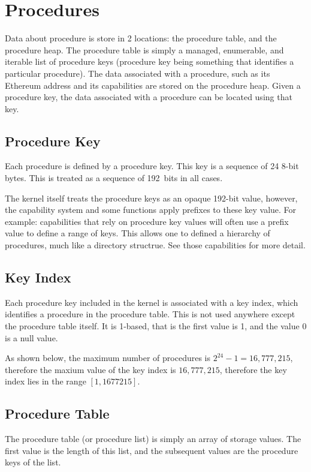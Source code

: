 \documentclass[english,a4paper]{article}
\begin{document}
\section{Procedures}\label{procedures}
Data about procedure is store in 2 locations: the procedure table, and the
procedure heap. The procedure table is simply a managed, enumerable, and
iterable list of procedure keys (procedure key being something that identifies a
particular procedure). The data associated with a procedure, such as its
Ethereum address and its capabilities are stored on the procedure heap. Given a
procedure key, the data associated with a procedure can be located using that
key.

\subsection{Procedure Key}
Each procedure is defined by a procedure key. This key is a sequence of 24 8-bit
bytes. This is treated as a sequence of 192~bits in all cases.

The kernel itself treats the procedure keys as an opaque 192-bit value, however,
the capability system and some functions apply prefixes to these key value. For
example: capabilities that rely on procedure key values will often use a prefix
value to define a range of keys. This allows one to defined a hierarchy of
procedures, much like a directory structrue. See those capabilities for more
detail.

\subsection{Key Index}
Each procedure key included in the kernel is associated with a key index, which
identifies a procedure in the procedure table. This is not used anywhere except
the procedure table itself. It is 1-based, that is the first value is 1, and the
value 0 is a null value.

As shown below, the maximum number of procedures is $2^{24} - 1 = 16,777,215$,
therefore the maxium value of the key index is $16,777,215$, therefore the key
index lies in the range $\left[1,1677215\right]$.

\subsection{Procedure Table}\label{procedure-table}
The procedure table (or procedure list) is simply an array of storage values.
The first value is the length of this list, and the subsequent values are the
procedure keys of the list.
\end{document}
